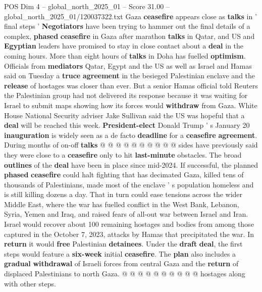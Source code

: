 \begin{textsample}{POS Dim 4 – global\_north\_2025\_01 – Score 31.00 – global\_north\_2025\_01/120037322.txt}  \label{ex:f4_pos_047}
Gaza \textbf{ceasefire} appears close as \textbf{talks} in ' final steps ' \textbf{Negotiators} have been trying to hammer out the final details of a complex, \textbf{phased} \textbf{ceasefire} in Gaza after marathon \textbf{talks} in Qatar, and US and \textbf{Egyptian} leaders have promised to stay in close contact about a \textbf{deal} in the coming hours.
More than eight hours of \textbf{talks} in Doha has fuelled \textbf{optimism}.
Officials from \textbf{mediators} Qatar, Egypt and the US as well as Israel and Hamas said on Tuesday a \textbf{truce} \textbf{agreement} in the besieged Palestinian enclave and the \textbf{release} of hostages was closer than ever.
But a senior Hamas official told Reuters the Palestinian group had not delivered its response because it was waiting for Israel to submit maps showing how its forces would \textbf{withdraw} from Gaza.
White House National Security adviser Jake Sullivan said the US was hopeful that a \textbf{deal} will be reached this week. \textbf{President-elect} Donald Trump ' s January 20 \textbf{inauguration} is widely seen as a de facto \textbf{deadline} for a \textbf{ceasefire} \textbf{agreement}.
During months of on-off \textbf{talks} @ @ @ @ @ @ @ @ @ @ sides have previously said they were close to a \textbf{ceasefire} only to hit \textbf{last-minute} obstacles.
The broad \textbf{outlines} of the \textbf{deal} have been in place since mid-2024.
If successful, the planned \textbf{phased} \textbf{ceasefire} could halt fighting that has decimated Gaza, killed tens of thousands of Palestinians, made most of the enclave ' s population homeless and is still killing dozens a day.
That in turn could ease tensions across the wider Middle East, where the war has fuelled conflict in the West Bank, Lebanon, Syria, Yemen and Iraq, and raised fears of all-out war between Israel and Iran.
Israel would recover about 100 remaining hostages and bodies from among those captured in the October 7, 2023, attacks by Hamas that precipitated the war.
In \textbf{return} it would \textbf{free} Palestinian \textbf{detainees}.
Under the \textbf{draft} \textbf{deal}, the first steps would feature a \textbf{six-week} initial \textbf{ceasefire}.
The \textbf{plan} also includes a \textbf{gradual} \textbf{withdrawal} of Israeli forces from central Gaza and the \textbf{return} of displaced Palestinians to north Gaza. @ @ @ @ @ @ @ @ @ @ hostages along with other steps.

\end{textsample}
